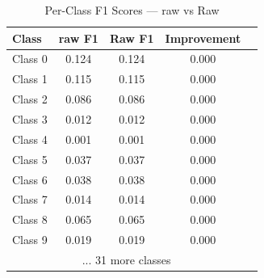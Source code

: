 \begin{table}[htbp]
\centering
\caption{Per-Class F1 Scores — raw vs Raw}
\label{tab:perclass_f1}
\begin{tabular}{lcccc}
\toprule
Class & raw F1 & Raw F1 & Improvement \\
\midrule
Class 0 & 0.124 & 0.124 & 0.000 \\
Class 1 & 0.115 & 0.115 & 0.000 \\
Class 2 & 0.086 & 0.086 & 0.000 \\
Class 3 & 0.012 & 0.012 & 0.000 \\
Class 4 & 0.001 & 0.001 & 0.000 \\
Class 5 & 0.037 & 0.037 & 0.000 \\
Class 6 & 0.038 & 0.038 & 0.000 \\
Class 7 & 0.014 & 0.014 & 0.000 \\
Class 8 & 0.065 & 0.065 & 0.000 \\
Class 9 & 0.019 & 0.019 & 0.000 \\
\midrule
\multicolumn{4}{c}{... 31 more classes} \\
\bottomrule
\end{tabular}
\end{table}